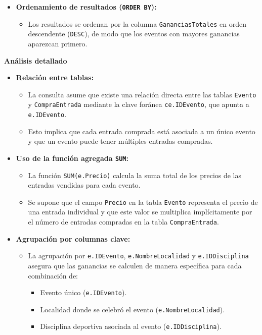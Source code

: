 \begin{itemize}
   \item \textbf{Ordenamiento de resultados (\texttt{ORDER BY}):}
   \begin{itemize}
       \item Los resultados se ordenan por la columna \texttt{GananciasTotales} en orden descendente (\texttt{DESC}), de modo que los eventos con mayores ganancias aparezcan primero.
   \end{itemize}
\end{itemize}

\textbf{Análisis detallado}

\begin{itemize}
   \item \textbf{Relación entre tablas:}
   \begin{itemize}
       \item La consulta asume que existe una relación directa entre las tablas \texttt{Evento} y \texttt{CompraEntrada} mediante la clave foránea \texttt{ce.IDEvento}, que apunta a \texttt{e.IDEvento}.
       \item Esto implica que cada entrada comprada está asociada a un único evento y que un evento puede tener múltiples entradas compradas.
   \end{itemize}

   \item \textbf{Uso de la función agregada \texttt{SUM}:}
   \begin{itemize}
       \item La función \texttt{SUM(e.Precio)} calcula la suma total de los precios de las entradas vendidas para cada evento.
       \item Se supone que el campo \texttt{Precio} en la tabla \texttt{Evento} representa el precio de una entrada individual y que este valor se multiplica implícitamente por el número de entradas compradas en la tabla \texttt{CompraEntrada}.
   \end{itemize}

   \item \textbf{Agrupación por columnas clave:}
   \begin{itemize}
       \item La agrupación por \texttt{e.IDEvento}, \texttt{e.NombreLocalidad} y \texttt{e.IDDisciplina} asegura que las ganancias se calculen de manera específica para cada combinación de:
       \begin{itemize}
           \item Evento único (\texttt{e.IDEvento}).
           \item Localidad donde se celebró el evento (\texttt{e.NombreLocalidad}).
           \item Disciplina deportiva asociada al evento (\texttt{e.IDDisciplina}).
       \end{itemize}
   \end{itemize}


\end{itemize}
